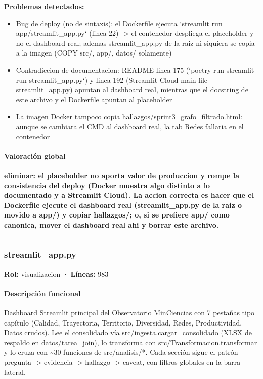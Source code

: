 \begin{tcolorbox}[riesgo]
\textbf{Problemas detectados:}
\begin{itemize}
  \item Bug de deploy (no de sintaxis): el Dockerfile ejecuta `streamlit run app/streamlit\_app.py` (linea 22) -> el contenedor despliega el placeholder y no el dashboard real; ademas streamlit\_app.py de la raiz ni siquiera se copia a la imagen (COPY src/, app/, datos/ solamente)
  \item Contradiccion de documentacion: README linea 175 (`poetry run streamlit run streamlit\_app.py`) y linea 192 (Streamlit Cloud main file streamlit\_app.py) apuntan al dashboard real, mientras que el docstring de este archivo y el Dockerfile apuntan al placeholder
  \item La imagen Docker tampoco copia hallazgos/sprint3\_grafo\_filtrado.html: aunque se cambiara el CMD al dashboard real, la tab Redes fallaria en el contenedor
\end{itemize}
\end{tcolorbox}

\paragraph{Valoración global}
\textbf{eliminar: el placeholder no aporta valor de produccion y rompe la consistencia del deploy (Docker muestra algo distinto a lo documentado y a Streamlit Cloud). La accion correcta es hacer que el Dockerfile ejecute el dashboard real (streamlit\_app.py de la raiz o movido a app/) y copiar hallazgos/; o, si se prefiere app/ como canonica, mover el dashboard real ahi y borrar este archivo.}

\medskip
\hrule

\subsubsection{streamlit\_app.py}
\textbf{Rol:} visualizacion · \textbf{Líneas:} 983

\paragraph{Descripción funcional}
Dashboard Streamlit principal del Observatorio MinCiencias con 7 pestañas tipo capítulo (Calidad, Trayectoria, Territorio, Diversidad, Redes, Productividad, Datos crudos). Lee el consolidado vía src/ingesta.cargar\_consolidado (XLSX de respaldo en datos/tarea\_join), lo transforma con src/Transformacion.transformar y lo cruza con \textasciitilde{}30 funciones de src/analisis/*. Cada sección sigue el patrón pregunta -> evidencia -> hallazgo -> caveat, con filtros globales en la barra lateral.

